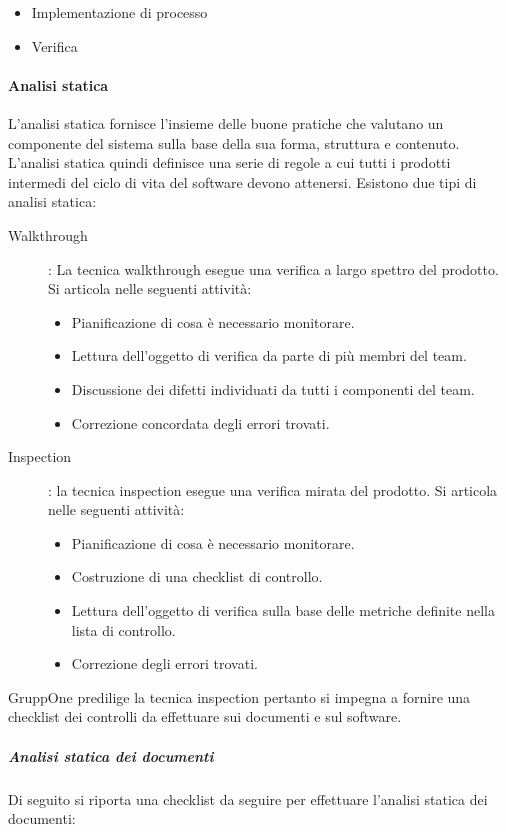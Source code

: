 \documentclass[../norme-di-progetto.tex]{subfiles}
\begin{document}
\begin{itemize}
  \item Implementazione di processo
  \item Verifica
\end{itemize}

\paragraph{Analisi statica}%
\label{par:analisi_statica}
L'analisi statica fornisce l'insieme delle buone pratiche che valutano un componente del sistema sulla base della sua forma, struttura e contenuto. L'analisi statica quindi definisce una serie di regole  a cui tutti i prodotti intermedi del ciclo di vita del software devono attenersi. Esistono due tipi di analisi statica:
\begin{description}
  \item [Walkthrough]: La tecnica walkthrough esegue una verifica a largo spettro del prodotto. Si articola nelle seguenti attività:
  \begin{itemize}
    \item Pianificazione di cosa è necessario monitorare.
    \item Lettura dell'oggetto di verifica da parte di più membri del team.
    \item Discussione dei difetti individuati da tutti i componenti del team.
    \item Correzione concordata degli errori trovati.
  \end{itemize}
  \item [Inspection]: la tecnica inspection esegue una verifica mirata del prodotto. Si articola nelle seguenti attività:
  \begin{itemize}
    \item Pianificazione di cosa è necessario monitorare.
    \item Costruzione di una checklist di controllo.
    \item Lettura dell'oggetto di verifica sulla base delle metriche definite nella lista di controllo.
    \item Correzione degli errori trovati.
  \end{itemize}
\end{description}
GruppOne predilige la tecnica inspection pertanto si impegna a fornire una checklist dei controlli da effettuare sui documenti e sul software.

\subparagraph{Analisi statica dei documenti}%
\label{subp:analisi_statica_dei_documenti}
Di seguito si riporta una checklist da seguire per effettuare l'analisi statica dei documenti:
\end{document}
